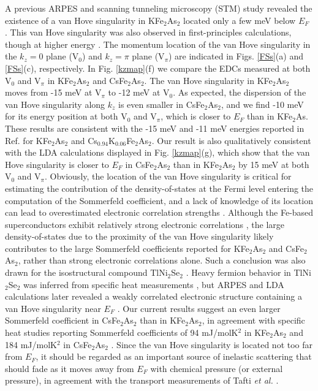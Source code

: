 \documentclass[twocolumn,aps,showpacs,preprintnumbers,amsmath,amssymb, superscriptaddress,longbibliography]{revtex4-1}
\begin{document}
A previous ARPES and scanning tunneling microscopy (STM) study revealed the existence of a van Hove singularity in KFe$_2$As$_2$ located only a few meV below $E_F$ \cite{DL_Fang_vHs}. This van Hove singularity was also observed in first-principles calculations, though at higher energy \cite{Drechsler_PSSB254}. The momentum location of the van Hove singularity in the $k_z=0$ plane (V$_0$)  and $k_z=\pi$ plane (V$_{\pi}$) are indicated in Figs. \ref{FSs}(a) and \ref{FSs}(c), respectively. In Fig. \ref{kzmap}(f) we compare the EDCs measured at both V$_0$ and V$_{\pi}$ in KFe$_2$As$_2$ and CsFe$_2$As$_2$. The van Hove singularity in KFe$_2$As$_2$ moves from -15 meV at V$_{\pi}$ to -12 meV at V$_0$. As expected, the dispersion of the van Hove singularity along $k_z$ is even smaller in CsFe$_2$As$_2$, and we find -10 meV for its energy position at both V$_0$ and V$_{\pi}$, which is closer to $E_F$ than in KFe$_2$As. These results are consistent with the -15 meV and -11 meV energies reported in Ref. \cite{Drechsler_JSNM31} for KFe$_2$As$_2$ and Cs$_{0.94}$K$_{0.06}$Fe$_2$As$_2$. Our result is also qualitatively consistent with the LDA calculations displayed in Fig. \ref{kzmap}(g), which show that the van Hove singularity is closer to $E_F$ in CsFe$_2$As$_2$ than in KFe$_2$As$_2$ by 15 meV at both V$_0$ and V$_{\pi}$. Obviously, the location of the van Hove singularity is critical for estimating the contribution of the density-of-states at the Fermi level entering the computation of the Sommerfeld coefficient, and a lack of knowledge of its location can lead to overestimated electronic correlation strengths \cite{Drechsler_PSSB254}. Although the Fe-based superconductors exhibit relatively strong electronic correlations \cite{vanRoekeghemCR17}, the large density-of-states due to the proximity of the van Hove singularity likely contributes to 
the large Sommerfeld coefficients reported for KFe$_2$As$_2$ and CsFe$_2$As$_2$, rather than strong electronic correlations alone. Such a conclusion was also drawn for the isostructural compound TlNi$_2$Se$_2$ \cite{Nan_XuPRB92}. Heavy fermion behavior in TlNi$_2$Se$_2$ was inferred from specific heat measurements \cite{H_WangPRL111}, but ARPES and LDA calculations later revealed a weakly correlated electronic structure containing a van Hove singularity near $E_F$ \cite{Nan_XuPRB92}. Our current results suggest an even larger Sommerfeld coefficient in CsFe$_2$As$_2$ than in KFe$_2$As$_2$, in agreement with specific heat studies \cite{Abdel-HafiezPRB85,AF_WangPRB87,Hardy_PRB94} reporting Sommerfeld coefficients of 94 mJ/molK$^{2}$ in KFe$_2$As$_2$ \cite{Abdel-HafiezPRB85} and 184 mJ/molK$^{2}$ in CsFe$_2$As$_2$ \cite{AF_WangPRB87}. Since the van Hove singularity is located not too far from $E_F$, it should be regarded as an important source of inelastic scattering that should fade as it moves away from $E_F$ with chemical pressure (or external pressure), in agreement with the transport measurements of Tafti \textit{et al.} \cite{Tafti_PRB89,Tafti_PRB91}. 
\end{document}
